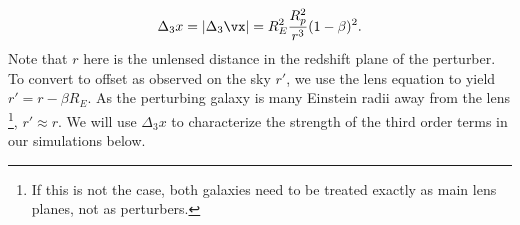 \begin{equation}
\Delta_3 x = | \Delta_3 \vx| = R_E^2 \frac{R_p^2}{r^3} (1 - \beta)^2. 
\end{equation}
Note that $r$ here is the unlensed distance in the redshift plane of the perturber. To convert to offset as observed on the sky $r'$, we use the lens equation to yield $r' = r - \beta R_E$. As the perturbing galaxy is many Einstein radii away from the lens \footnote{If this is not the case, both galaxies need to be treated exactly as main lens planes, not as perturbers.}, $r' \approx r$. We will use $\Delta_3 x$ to characterize the strength of the third order terms in our simulations below.